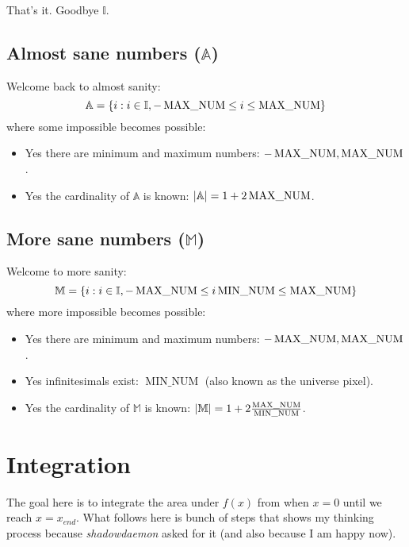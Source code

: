 \documentclass{report}
\DeclareMathOperator{\minnum}{MIN\_NUM}
\begin{document}
That's it. Goodbye $\mathbb{I}$.


\section{Almost sane numbers ($\mathbb{A}$)}
Welcome back to almost sanity:
\[
    \mathbb{A} = \{i : i \in \mathbb{I}, -\operatorname{MAX\_NUM} \le i \le \operatorname{MAX\_NUM}\}
\]
where some impossible becomes possible:
\begin{itemize}
    \item Yes there are minimum and maximum numbers: $-\operatorname{MAX\_NUM}, \operatorname{MAX\_NUM}$.
    \item Yes the cardinality of $\mathbb{A}$ is known: $|\mathbb{A}| = 1 +
    2\operatorname{MAX\_NUM}$.
\end{itemize}


\section{More sane numbers ($\mathbb{M}$)}
Welcome to more sanity:
\[
    \mathbb{M} = \{i : i \in \mathbb{I}, -\maxnum \le i\minnum \le \maxnum\}
\]
where more impossible becomes possible:
\begin{itemize}
    \item Yes there are minimum and maximum numbers: $-\operatorname{MAX\_NUM}, \operatorname{MAX\_NUM}$.
    \item Yes infinitesimals exist: $\minnum$ (also known as the universe pixel).
    \item Yes the cardinality of $\mathbb{M}$ is known: $|\mathbb{M}| = 1 +
    2\frac{\maxnum}{\minnum}$.
\end{itemize}



\chapter{Integration}
The goal here is to integrate the area under $f(x)$ from when $x = 0$ until we
reach $x = x_{end}$. What follows here is bunch of steps that shows my thinking
process because \emph{shadowdaemon} asked for it (and also because I am happy now).
\end{document}
